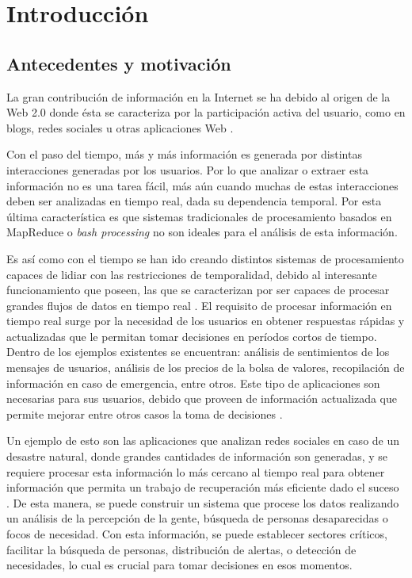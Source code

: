 \chapter{Introducción}
\label{cap:introduccion}

\section{Antecedentes y motivación}
\label{intro:motivacion}

La gran contribución de información en la Internet se ha debido al origen de la Web 2.0 donde ésta se caracteriza por la participación activa del usuario, \normalsize{como} en blogs, redes sociales u otras aplicaciones Web \citep{web2007oberhelman}.


Con el paso del tiempo, más y más información es generada por distintas interacciones generadas por los usuarios. \normalsize{Por lo que analizar} o extraer esta información no es una tarea fácil, más aún cuando muchas de estas interacciones deben ser analizadas en tiempo real, dada su dependencia temporal. Por esta última característica es que sistemas tradicionales de procesamiento basados en MapReduce \citep{2010Lin} o \textit{bash processing} \citep{HawwashN14} no son ideales para el análisis de esta información.

Es así como con el tiempo se han ido creando distintos sistemas de procesamiento capaces de lidiar con las restricciones de temporalidad, debido al interesante funcionamiento que poseen, las que se caracterizan por ser capaces de procesar grandes flujos de datos en tiempo real \citep{ChenZ14a}. El requisito de procesar informaci\'on en tiempo real surge por la necesidad de los usuarios en obtener respuestas r\'apidas y actualizadas que le permitan tomar decisiones en per\'iodos cortos de tiempo. Dentro de los ejemplos existentes se encuentran: análisis de sentimientos de los mensajes de usuarios, análisis de los precios de la bolsa de valores, recopilación de información en caso de emergencia, entre otros. Este tipo de aplicaciones son necesarias para sus usuarios, debido que proveen de información actualizada que permite mejorar entre otros casos la toma de decisiones \citep{Wenzel14}.

Un ejemplo de esto son las aplicaciones que analizan redes sociales en caso de un desastre natural, donde grandes cantidades de información son generadas, y se requiere procesar esta información lo más cercano al tiempo real para obtener información que permita un trabajo de recuperación más eficiente dado el suceso \citep{andrade2014fundamentals}. De esta manera, se puede construir un sistema que procese los datos realizando un análisis de la percepción de la gente, búsqueda de personas desaparecidas o focos de necesidad. Con esta información, se puede establecer sectores críticos, facilitar la búsqueda de personas, distribución de alertas, o detección de necesidades, lo cual es crucial para tomar decisiones en esos momentos.

